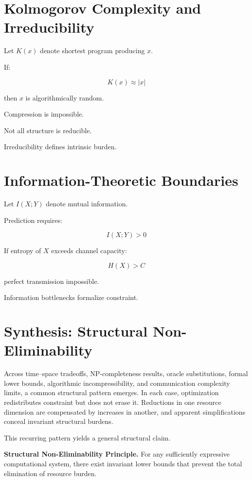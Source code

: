\documentclass[11pt,openany]{book}
\begin{document}
\section{Kolmogorov Complexity and Irreducibility}

Let $K(x)$ denote shortest program producing $x$.

If:

\[
K(x) \approx |x|
\]

then $x$ is algorithmically random.

Compression is impossible.

Not all structure is reducible.

Irreducibility defines intrinsic burden.

\section{Information-Theoretic Boundaries}

Let $I(X;Y)$ denote mutual information.

Prediction requires:

\[
I(X;Y) > 0
\]

If entropy of $X$ exceeds channel capacity:

\[
H(X) > C
\]

perfect transmission impossible.

Information bottlenecks formalize constraint.

\section{Synthesis: Structural Non-Eliminability}

Across time--space tradeoffs, NP-completeness results, oracle substitutions, 
formal lower bounds, algorithmic incompressibility, and communication 
complexity limits, a common structural pattern emerges. In each case, 
optimization redistributes constraint but does not erase it. Reductions 
in one resource dimension are compensated by increases in another, and 
apparent simplifications conceal invariant structural burdens.

This recurring pattern yields a general structural claim.

\medskip

\textbf{Structural Non-Eliminability Principle.}
For any sufficiently expressive computational system, there exist invariant 
lower bounds that prevent the total elimination of resource burden.
\end{document}
